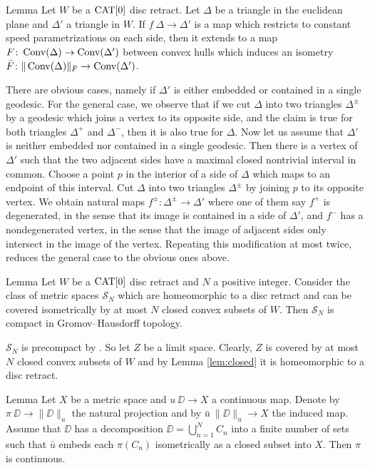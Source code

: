 \documentclass[a4paper,10pt]{amsart}
\begin{document}
\begin{thm}{Lemma}\label{lem:isomtri}
Let $W$ be a $\mathop{\rm CAT}\nolimits[0]$ disc retract. 
Let $\Delta$ be a triangle in the euclidean plane
and $\Delta'$ a triangle in $W$. 
If $f\:\Delta\to \Delta'$ is a map which restricts to constant speed
parametrizations on each side, then it extends to a map 
$F\colon\mathop{\rm Conv}\nolimits(\Delta)\to \mathop{\rm Conv}\nolimits(\Delta')$ between convex hulls which induces an isometry $\bar F\colon\|\mathop{\rm Conv}\nolimits(\Delta)\|_F\to \mathop{\rm Conv}\nolimits(\Delta')$. 
\end{thm}

There are obvious cases, namely if $\Delta'$ is either embedded or contained in a single geodesic. 
For the general case, we observe that if we cut $\Delta$ into two triangles $\Delta^\pm$ by a geodesic which joins a vertex to its opposite side, and  
the claim is true for both triangles $\Delta^+$ and $\Delta^-$, then it is also true for $\Delta$. Now let us assume that $\Delta'$ is neither embedded nor contained
in a single geodesic. Then there is a vertex of $\Delta'$ such that the two adjacent sides have a maximal closed nontrivial interval in common. Choose a point $p$ in the interior
of a side of $\Delta$ which maps to an endpoint of this interval. Cut $\Delta$ into two triangles $\Delta^\pm$ by joining $p$ to its opposite vertex.
We obtain natural maps $f^\pm:\Delta^\pm\to\Delta'$ where one of them say $f^+$ is degenerated, in the sense that its image is contained in a side of $\Delta'$, and $f^-$ has 
a nondegenerated vertex, in the sense that the image of adjacent sides only intersect in the image of the vertex. Repeating this modification at most twice,
reduces the general case to the  obvious ones above.
\qeds

\begin{thm}{Lemma}\label{lem:puzzle-compact}
Let $W$ be a $\mathop{\rm CAT}\nolimits[0]$ disc retract 
and $N$ a positive integer. 
Consider the class of metric spaces $\mathcal{S}_N$ 
which are homeomorphic to a disc retract
and can be covered isometrically by at most $N$ closed convex subsets of $W$.
Then $\mathcal{S}_N$ is compact in Gromov--Hausdorff topology.
\end{thm}

$\mathcal{S}_N$ is precompact by \cite[7.4.15]{BBI}. So let $Z$ be a limit space. Clearly, $Z$
is covered by at most $N$ closed convex subsets of 
$W$ and by Lemma \ref{lem:closed} it is homeomorphic to a disc retract.
\qeds

\begin{thm}{Lemma}\label{lem:proj-continuous}
Let $X$ be a metric space and $u\:\DD\to X$ a continuous map. Denote by $\pi\:\DD\to \|\DD\|_u$ the natural projection and
by $\bar u\:\|\DD\|_u\to X$ the induced map. Assume that $\DD$ has a decomposition $\DD=\bigcup_{n=1}^N C_n$ into a finite 
number of sets such that $\bar u$ embeds each $\pi(C_n)$ isometrically as a closed subset into $X$. Then $\pi$
is continuous.
\end{thm}
\end{document}
